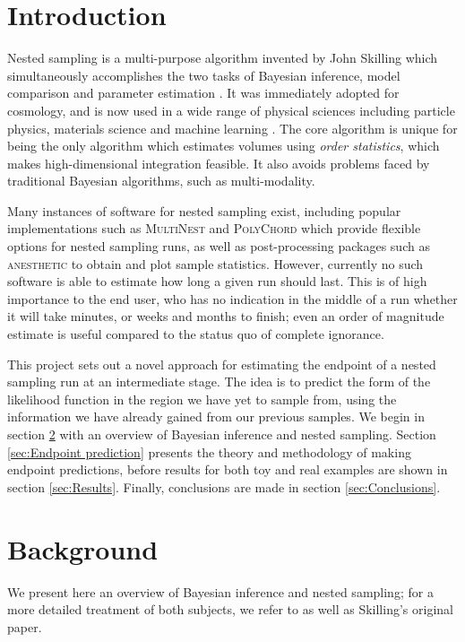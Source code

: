 \documentclass[usenatbib]{mnras}
\begin{document}
\section{Introduction}
Nested sampling is a multi-purpose algorithm invented by John Skilling which simultaneously accomplishes the two tasks of Bayesian inference, model comparison and parameter estimation \citep{skilling}. It was immediately adopted for cosmology, and is now used in a wide range of physical sciences including particle physics, materials science \citep{physical_scientists} and machine learning \citep{split}. The core algorithm is unique for being the only algorithm which estimates volumes using \textit{order statistics}, which makes high-dimensional integration feasible. It also avoids problems faced by traditional Bayesian algorithms, such as multi-modality.
\par
Many instances of software for nested sampling exist, including popular implementations such as \textsc{MultiNest} \citep{multinest} and \textsc{PolyChord} \citep{polychord} which provide flexible options for nested sampling runs, as well as post-processing packages such as \textsc{anesthetic} \citep{anesthetic} to obtain and plot sample statistics. However, currently no such software is able to estimate how long a given run should last. This is of high importance to the end user, who has no indication in the middle of a run whether it will take minutes, or weeks and months to finish; even an order of magnitude estimate is useful compared to the status quo of complete ignorance.
\par
This project sets out a novel approach for estimating the endpoint of a nested sampling run at an intermediate stage. The idea is to predict the form of the likelihood function in the region we have yet to sample from, using the information we have already gained from our previous samples. We begin in section \ref{sec:Background} with an overview of Bayesian inference and nested sampling. Section \ref{sec:Endpoint prediction} presents the theory and methodology of making endpoint predictions, before results for both toy and real examples are shown in section \ref{sec:Results}. Finally, conclusions are made in section \ref{sec:Conclusions}.  


\section{Background}\label{sec:Background}
\prntlen{\textwidth}
We present here an overview of Bayesian inference and nested sampling; for a more detailed treatment of both subjects, we refer to \citet{sivia} as well as Skilling's original paper. 
\end{document}
